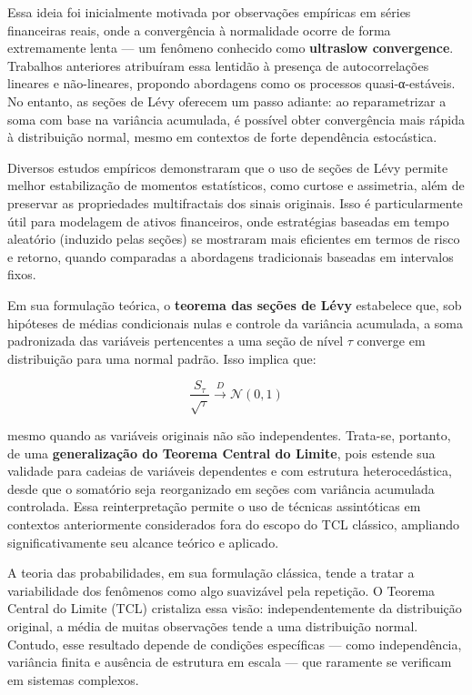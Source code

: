 \documentclass[
]{agujournal2019}
\begin{document}
Essa ideia foi inicialmente motivada por observações empíricas em séries
financeiras reais, onde a convergência à normalidade ocorre de forma
extremamente lenta --- um fenômeno conhecido como \textbf{ultraslow
convergence}. Trabalhos anteriores atribuíram essa lentidão à presença
de autocorrelações lineares e não-lineares, propondo abordagens como os
processos quasi-α-estáveis. No entanto, as seções de Lévy oferecem um
passo adiante: ao reparametrizar a soma com base na variância acumulada,
é possível obter convergência mais rápida à distribuição normal, mesmo
em contextos de forte dependência estocástica.

Diversos estudos empíricos demonstraram que o uso de seções de Lévy
permite melhor estabilização de momentos estatísticos, como curtose e
assimetria, além de preservar as propriedades multifractais dos sinais
originais. Isso é particularmente útil para modelagem de ativos
financeiros, onde estratégias baseadas em tempo aleatório (induzido
pelas seções) se mostraram mais eficientes em termos de risco e retorno,
quando comparadas a abordagens tradicionais baseadas em intervalos
fixos.

Em sua formulação teórica, o \textbf{teorema das seções de Lévy}
estabelece que, sob hipóteses de médias condicionais nulas e controle da
variância acumulada, a soma padronizada das variáveis pertencentes a uma
seção de nível \(\tau\) converge em distribuição para uma normal padrão.
Isso implica que:

\[
\frac{S_\tau}{\sqrt{\tau}} \xrightarrow{D} \mathcal{N}(0, 1)
\]

mesmo quando as variáveis originais não são independentes. Trata-se,
portanto, de uma \textbf{generalização do Teorema Central do Limite},
pois estende sua validade para cadeias de variáveis dependentes e com
estrutura heterocedástica, desde que o somatório seja reorganizado em
seções com variância acumulada controlada. Essa reinterpretação permite
o uso de técnicas assintóticas em contextos anteriormente considerados
fora do escopo do TCL clássico, ampliando significativamente seu alcance
teórico e aplicado.

A teoria das probabilidades, em sua formulação clássica, tende a tratar
a variabilidade dos fenômenos como algo suavizável pela repetição. O
Teorema Central do Limite (TCL) cristaliza essa visão: independentemente
da distribuição original, a média de muitas observações tende a uma
distribuição normal. Contudo, esse resultado depende de condições
específicas --- como independência, variância finita e ausência de
estrutura em escala --- que raramente se verificam em sistemas
complexos.
\end{document}
